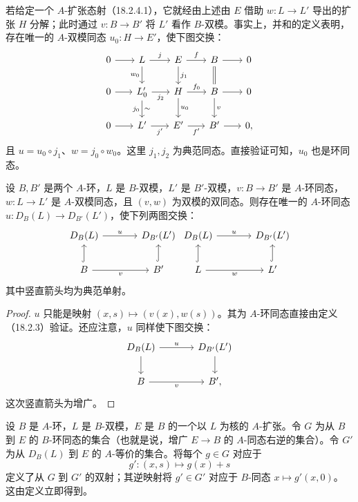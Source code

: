 若给定一个 $A$-扩张态射（18.2.4.1），它就经由上述由 $E$ 借助 $w:L\to L'$ 导出的扩张 $H$ 分解；此时通过 $v:B\to B'$ 将 $L'$ 看作 $B$-双模。事实上，并和的定义表明，存在唯一的 $A$-双模同态 $u_0:H\to E'$，使下图交换：
\[
\begin{tikzcd}[column sep=1.8em,row sep=1.8em]
0\arrow[r]&L\arrow[r,"j"]\arrow[d,"w_0"']&E\arrow[r,"f"]\arrow[d,"j_1"]&B\arrow[r]\arrow[d,equal]&0\\
0\arrow[r]&L'_0\arrow[r,"j_2"']\arrow[d,"j_0"',"\sim"]&H\arrow[r,"f_0"]\arrow[d,"u_0"]&B\arrow[r]\arrow[d,"v"]&0\\
0\arrow[r]&L'\arrow[r,"j'"']&E'\arrow[r,"f'"']&B'\arrow[r]&0,
\end{tikzcd}
\]
且 $u=u_0\circ j_1$、$w=j_0\circ w_0$。这里 $j_1,j_2$ 为典范同态。直接验证可知，$u_0$ 也是环同态。

设 $B,B'$ 是两个 $A$-环，$L$ 是 $B$-双模，$L'$ 是 $B'$-双模，$v:B\to B'$ 是 $A$-环同态，$w:L\to L'$ 是 $A$-双模同态，且 $(v,w)$ 为双模的双同态。则存在唯一的 $A$-环同态 $u:D_B(L)\to D_{B'}(L')$，使下列两图交换：
\[
\begin{tikzcd}[column sep=large]
D_B(L)\arrow[r,"u"]&D_{B'}(L')\\
B\arrow[u,hook]\arrow[r,"v"']&B'\arrow[u,hook]
\end{tikzcd}
\qquad
\begin{tikzcd}[column sep=large]
D_B(L)\arrow[r,"u"]&D_{B'}(L')\\
L\arrow[u,hook]\arrow[r,"w"']&L'\arrow[u,hook]
\end{tikzcd}
\]
其中竖直箭头均为典范单射。
\begin{proof}
$u$ 只能是映射 $(x,s)\mapsto(v(x),w(s))$。其为 $A$-环同态直接由定义（18.2.3）验证。还应注意，$u$ 同样使下图交换：
\[
\begin{tikzcd}[column sep=large]
D_B(L)\arrow[r,"u"]\arrow[d]&D_{B'}(L')\arrow[d]\\
B\arrow[r,"v"']&B',
\end{tikzcd}
\]
这次竖直箭头为增广。
\end{proof}

设 $B$ 是 $A$-环，$L$ 是 $B$-双模，$E$ 是 $B$ 的一个以 $L$ 为核的 $A$-扩张。令 $G$ 为从 $B$ 到 $E$ 的 $B$-环同态的集合（也就是说，增广 $E\to B$ 的 $A$-同态右逆的集合）。令 $G'$ 为从 $D_B(L)$ 到 $E$ 的 $A$-等价的集合。将每个 $g\in G$ 对应于
\[
 g':(x,s)\longmapsto g(x)+s
\]
定义了从 $G$ 到 $G'$ 的双射；其逆映射将 $g'\in G'$ 对应于 $B$-同态 $x\mapsto g'(x,0)$。
这由定义立即得到。

